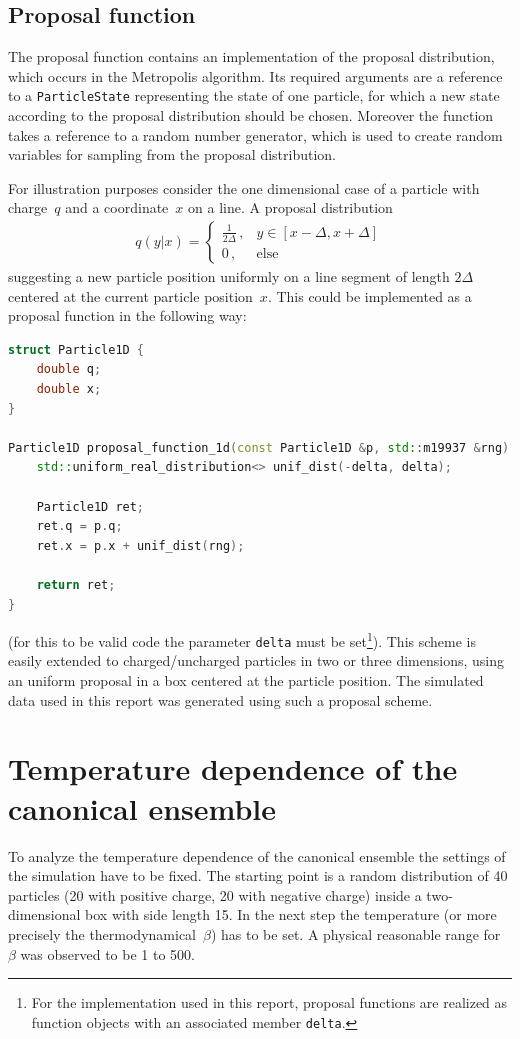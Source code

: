 \documentclass[11pt, a4paper]{article}
\numberwithin{equation}{section}
\begin{document}
\subsection{Proposal function} \label{sec:proposal_function}
The proposal function contains an implementation of the proposal distribution, which occurs in the Metropolis algorithm.
Its required arguments are a reference to a \texttt{ParticleState} representing the state of one particle, for which a new state according to the proposal distribution should be chosen.
Moreover the function takes a reference to a random number generator, which is used to create random variables for sampling from the proposal distribution.

For illustration purposes consider the one dimensional case of a particle with charge~$q$ and a coordinate~$x$ on a line.
A proposal distribution
\begin{align*}
	q(y|x) = \begin{cases}
		\frac{1}{2\Delta} \,, & y \in \left[x - \Delta, x + \Delta \right]\\
		0 \,, & \text{else}
	\end{cases}
\end{align*}
suggesting a new particle position uniformly on a line segment of length $2\Delta$ centered at the current particle position~$x$.
This could be implemented as a proposal function in the following way:
\begin{lstlisting}[language=C++]
struct Particle1D {
	double q;
	double x;
}

Particle1D proposal_function_1d(const Particle1D &p, std::m19937 &rng) {
	std::uniform_real_distribution<> unif_dist(-delta, delta);
	
	Particle1D ret;
	ret.q = p.q;
	ret.x = p.x + unif_dist(rng);
	
	return ret;
}
\end{lstlisting}
(for this to be valid code the parameter \texttt{delta} must be set\footnote{For the implementation used in this report, proposal functions are realized as function objects with an associated member \texttt{delta}.}).
This scheme is easily extended to charged/uncharged particles in two or three dimensions, using an uniform proposal in a box centered at the particle position.
The simulated data used in this report was generated using such a proposal scheme.







\section{Temperature dependence of the canonical ensemble} \label{sec:Temperature}
To analyze the temperature dependence of the canonical ensemble the settings of the simulation have to be fixed. 
The starting point is a random distribution of 40 particles (20 with positive charge, 20 with negative charge) inside a two-dimensional box with side length 15.
In the next step the temperature (or more precisely the thermodynamical~$\beta$) has to be set. 
A physical reasonable range for $\beta$ was observed to be 1 to 500. 
\end{document}
